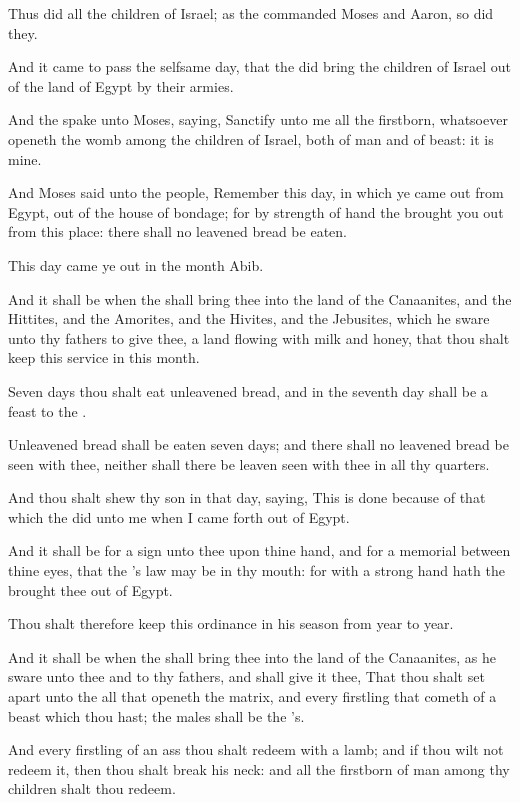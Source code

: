 \Verse Thus did all the children of Israel; as the \LORD commanded Moses and Aaron, so did they.

\Verse And it came to pass the selfsame day, that the \LORD did bring the children of Israel out of the land of Egypt by their armies.

\Chapter
\Verse And the \LORD spake unto Moses, saying, \Verse Sanctify unto me all the firstborn, whatsoever openeth the womb among the children of Israel, both of man and of beast: it is mine.

\Verse And Moses said unto the people, Remember this day, in which ye came out from Egypt, out of the house of bondage; for by strength of hand the \LORD brought you out from this place: there shall no leavened bread be eaten.

\Verse This day came ye out in the month Abib.

\Verse And it shall be when the \LORD shall bring thee into the land of the Canaanites, and the Hittites, and the Amorites, and the Hivites, and the Jebusites, which he sware unto thy fathers to give thee, a land flowing with milk and honey, that thou shalt keep this service in this month.

\Verse Seven days thou shalt eat unleavened bread, and in the seventh day shall be a feast to the \LORD.

\Verse Unleavened bread shall be eaten seven days; and there shall no leavened bread be seen with thee, neither shall there be leaven seen with thee in all thy quarters.

\Verse And thou shalt shew thy son in that day, saying, This is done because of that which the \LORD did unto me when I came forth out of Egypt.

\Verse And it shall be for a sign unto thee upon thine hand, and for a memorial between thine eyes, that the \LORD's law may be in thy mouth: for with a strong hand hath the \LORD brought thee out of Egypt.

\Verse Thou shalt therefore keep this ordinance in his season from year to year.

\Verse And it shall be when the \LORD shall bring thee into the land of the Canaanites, as he sware unto thee and to thy fathers, and shall give it thee, \Verse That thou shalt set apart unto the \LORD all that openeth the matrix, and every firstling that cometh of a beast which thou hast; the males shall be the \LORD's.

\Verse And every firstling of an ass thou shalt redeem with a lamb; and if thou wilt not redeem it, then thou shalt break his neck: and all the firstborn of man among thy children shalt thou redeem.

